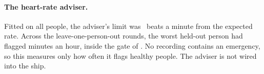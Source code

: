\paragraph{The heart-rate adviser.}
Fitted on all \numHrPeople{} people, the adviser's limit was \numHrLimitBpm~beats a minute from the expected rate. Across the \numHrPeople{} leave-one-person-out rounds, the worst held-out person had \numHrWorstFlaggedMinPerH{} flagged minutes an hour, inside the gate of \numHrGateMinPerH. No recording contains an emergency, so this measures only how often it flags healthy people. The adviser is not wired into the ship.
